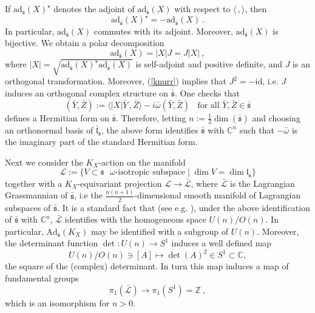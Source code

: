 \documentclass[10]{amsart}
\theoremstyle{remark}
\theoremstyle{definition}
\numberwithin{equation}{section}
\newcommand{\id}{\mathrm{id}}
\newcommand{\Ad}{\text{Ad}}
\newcommand{\ad}{\text{ad}}
\newcommand{\fl}{{\mathfrak l}}
\newcommand{\fs}{{\mathfrak s}}
\newcommand{\beu}{\begin{equation*}}
\newcommand{\IP}[2]{\langle#1\,, #2\rangle}     %
\newcommand{\defn}{{:=}}
\begin{document}
{If $\ad_{\bar\fs}(X)^{\star}$ denotes the adjoint of $\ad_{\bar\fs}(X)$ with respect to $\IP{}{}$, then 
%
\begin{equation}\label{knurr} 
\ad_{\bar\fs}(X)^{\star}=-\ad_{\bar\fs}(X)\ .
\end{equation}
%
In particular, $\ad_{\bar\fs}(X)$ commutes with its adjoint. Moreover, $\ad_{\bar\fs}(X)$ is bijective.  We obtain a polar decomposition
\beu
\ad_{\bar\fs}(X)=|X|J=J|X|\ ,
\end{equation*}
where $|X|=\sqrt{\ad_{\bar\fs}(X)^{\star}\ad_{\bar\fs}(X)}$ is self-adjoint and positive definite, and $J$ is an orthogonal transformation. Moreover, (\ref{knurr}) implies that $J^2=-\id$, i.e.  $J$ induces an orthogonal complex structure on $\bar\fs$.
One checks that 
%
\beu
(\bar Y,\bar Z)\defn\IP{|X|\bar Y}{\bar Z}-{i}\bar\omega(\bar Y,\bar Z)\;\;\text{ for all }\bar Y,\bar Z\in\bar\fs
\end{equation*}
%
defines a Hermitian form on $\bar\fs$.
Therefore, letting $n\defn\frac{1}{2}\dim(\bar\fs)$ and choosing an orthonormal basis 
of $\bar\fl_{\fs}$, the above form identifies $\bar\fs$ with $\mathbb{C}^n$ such that $-\bar\omega$ is the imaginary part of the standard Hermitian form. 

Next we consider the $K_X$-action on the manifold 
%
\beu
\mathcal L\defn\{ V\subset \fs\mbox{ $\omega$-isotropic subspace} \mid \dim V=\dim\fl_{\fs}\}
\end{equation*}
%
together with a $K_X$-equivariant projection $\mathcal L\rightarrow \bar{\mathcal L}$, where $\bar{\mathcal L}$ is the Lagrangian Grassmannian of $\bar\fs$, 
i.e the $\frac{n(n+1)}{2}$-dimensional smooth manifold of Lagrangian subspaces of $\bar\fs$. It is a standard fact that (see e.g. \cite{GS77}), 
under the above identification of $\bar\fs$ with $\mathbb{C}^{n}$, $\bar{\mathcal L}$ identifies with the homogeneous space $U(n)/O(n)$. In particular, $\Ad_{\bar\fs}(K_X)$ may 
be identified with a subgroup of $U(n)$. Moreover, the determinant function $\det:U(n)\rightarrow S^{1}$ induces a well defined map 
%
\begin{equation}\label{paula}
U(n)/O(n)\ni [A] \mapsto \det(A)^2\in S^1\subset\mathbb{C},
\end{equation}
%
the square of the (complex) determinant. In turn this map induces a map of fundamental groups 
%
\begin{equation}\label{ernst}
\pi_1(\bar{\mathcal L})\rightarrow\pi_1(S^1)=\mathbb{Z}\ ,
\end{equation}
%
which is an isomorphism for $n>0$. 

}
\end{document}
